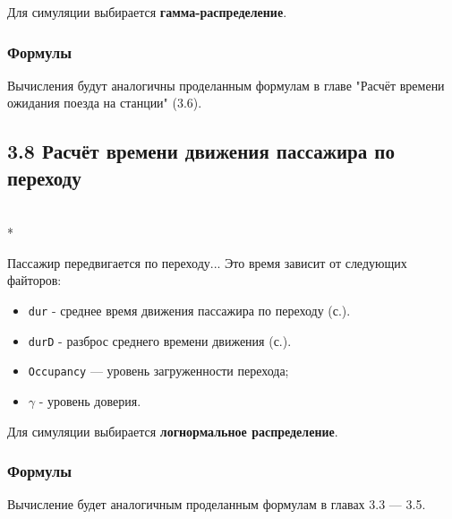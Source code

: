 \documentclass[12pt]{article}
\begin{document}
Для симуляции выбирается \textbf{гамма-распределение}.

\subsubsection*{Формулы}

Вычисления будут аналогичны проделанным формулам в
главе "Расчёт времени ожидания поезда на станции" (3.6).

\subsection*{3.8 Расчёт времени движения пассажира по переходу}\mbox{}\\*

Пассажир передвигается по переходу... Это время зависит
от следующих файторов:

\begin{itemize}
  \item \texttt{dur} - среднее время движения пассажира по переходу (с.).
  \item \texttt{durD} - разброс среднего времени движения (с.).
  \item \texttt{Occupancy} — уровень загруженности перехода;
  \item $\gamma$ - уровень доверия.
\end{itemize}

Для симуляции выбирается \textbf{логнормальное распределение}.

\subsubsection*{Формулы}

Вычисление будет аналогичным проделанным формулам в
главах 3.3 --- 3.5.
\end{document}
